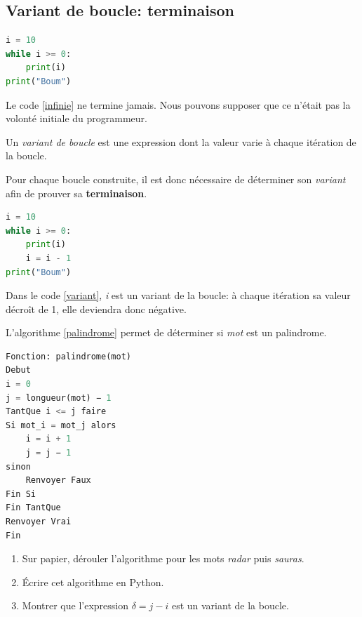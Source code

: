 \documentclass[a4paper,11pt]{article}
\begin{document}
\begin{Form}
\section{Variant de boucle: terminaison}
\begin{center}
\begin{lstlisting}[language=Python]
i = 10
while i >= 0:
    print(i)
print("Boum")
\end{lstlisting}
\label{infinie}
\end{center}
Le code \ref{infinie} ne termine jamais. Nous pouvons supposer que ce n'était pas la volonté initiale du programmeur.
\begin{aretenir}[]
Un \emph{variant de boucle} est une expression dont la valeur varie à chaque itération de la boucle.
\end{aretenir}
Pour chaque boucle construite, il est donc nécessaire de déterminer son \emph{variant} afin de prouver sa \textbf{terminaison}.
\begin{center}
\begin{lstlisting}[language=Python]
i = 10
while i >= 0:
    print(i)
    i = i - 1
print("Boum")
\end{lstlisting}
\label{variant}
\end{center}
Dans le code \ref{variant}, \emph{i} est un variant de la boucle: à chaque itération sa valeur décroît de 1, elle deviendra donc négative.
\begin{activite}
L'algorithme \ref{palindrome} permet de déterminer si \emph{mot} est un palindrome.
\begin{center}
\begin{lstlisting}[language=Python]
Fonction: palindrome(mot)
Debut
i = 0
j = longueur(mot) − 1
TantQue i <= j faire
Si mot_i = mot_j alors
	i = i + 1
	j = j − 1
sinon
	Renvoyer Faux
Fin Si
Fin TantQue
Renvoyer Vrai
Fin
\end{lstlisting}
\label{palindrome}
\end{center}
\begin{enumerate}
\item Sur papier, dérouler l'algorithme pour les mots \emph{radar} puis \emph{sauras}.
\item Écrire cet algorithme en Python.
\item Montrer que l'expression $\delta=j-i$ est un variant de la boucle.
\end{enumerate}
\end{activite}

\end{Form}
\end{document}
